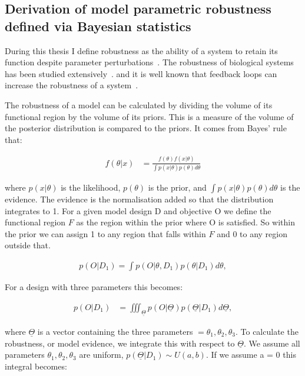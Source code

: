 \subsection{Derivation of model parametric robustness defined via Bayesian statistics}
\label{sec:rob_back}
During this thesis I define robustness as the ability of a system to retain its function despite parameter perturbations~\autocite{Stelling:2004wo}. The robustness of biological systems has been studied extensively~\autocite{Barkai:1997cd, Stelling:2004wo, Prill:2005fq, Kim:2006uk, Kitano:2007cp, Hafner:2009ct, Shinar:2010dd, ZamoraSillero:2011jw, Woods:2016eh}. and it is well known that feedback loops can increase the robustness of a system~\autocite{Becskei:2000ft,	 DOYLE:2005ul}.

The robustness of a model can be calculated by dividing the volume of its functional region by the volume of its priors. This is a measure of the volume of the posterior distribution is compared to the priors. It comes from Bayes' rule that:

\begin{align}
	f(\theta|x) &= \frac{f(\theta)f(x|\theta)}{\int p(x|\theta)p(\theta)d\theta}
\end{align}

\noindent where $p(x|\theta)$ is the likelihood, $p(\theta)$ is the prior, and $\displaystyle \int p(x|\theta)p(\theta)d\theta$ is the evidence. The evidence is the normalisation  added so that the distribution integrates to 1. For a given model design D and objective O we define the functional region $F$ as the region within the prior where O is satisfied. So within the prior we can assign 1 to any region that falls within $F$ and 0 to any region outside that. 

\begin{align}
p(O|D_1) = \int p(O|\theta,D_1)p(\theta|D_1)d\theta,
\end{align}

\noindent For a design with three parameters this becomes:

\begin{align}
p(O|D_1) &= \displaystyle \iiint_{\underline{\Theta}} p(O|\underline{\Theta})p(\underline{\Theta}|D_1)d\underline{\Theta},
\end{align}

\noindent where $\underline{\Theta}$ is a vector containing the three parameters $ = \theta_1, \theta_2,\theta_3$. To calculate the robustness, or model evidence, we integrate this with respect to $\underline{\Theta}$. We assume  all parameters $\theta_1, \theta_2,\theta_3$ are uniform, $p(\underline{\Theta}|D_1) \sim U(a, b)$. If we assume a = 0 this integral becomes:

